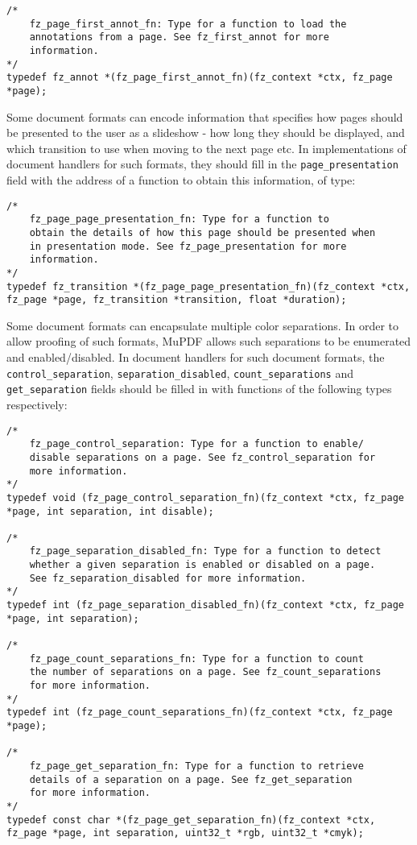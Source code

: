 \documentclass[oneside]{book}
\begin{document}
\begin{lstlisting}
/*
	fz_page_first_annot_fn: Type for a function to load the
	annotations from a page. See fz_first_annot for more
	information.
*/
typedef fz_annot *(fz_page_first_annot_fn)(fz_context *ctx, fz_page *page);
\end{lstlisting}

Some document formats can encode information that specifies how pages should be presented to the user as a slideshow - how long they should be displayed, and which transition to use when moving to the next page etc. In implementations of document handlers for such formats, they should fill in the \texttt{page\_presentation} field with the address of a function to obtain this information, of type:

\begin{lstlisting}
/*
	fz_page_page_presentation_fn: Type for a function to
	obtain the details of how this page should be presented when
	in presentation mode. See fz_page_presentation for more
	information.
*/
typedef fz_transition *(fz_page_page_presentation_fn)(fz_context *ctx, fz_page *page, fz_transition *transition, float *duration);
\end{lstlisting}

Some document formats can encapsulate multiple color separations. In order to allow proofing of such formats, MuPDF allows such separations to be enumerated and enabled/disabled. In document handlers for such document formats, the \texttt{control\_separation}, \texttt{separation\_disabled}, \texttt{count\_separations} and \texttt{get\_separation} fields should be filled in with functions of the following types respectively:

\begin{lstlisting}
/*
	fz_page_control_separation: Type for a function to enable/
	disable separations on a page. See fz_control_separation for
	more information.
*/
typedef void (fz_page_control_separation_fn)(fz_context *ctx, fz_page *page, int separation, int disable);

/*
	fz_page_separation_disabled_fn: Type for a function to detect
	whether a given separation is enabled or disabled on a page.
	See fz_separation_disabled for more information.
*/
typedef int (fz_page_separation_disabled_fn)(fz_context *ctx, fz_page *page, int separation);

/*
	fz_page_count_separations_fn: Type for a function to count
	the number of separations on a page. See fz_count_separations
	for more information.
*/
typedef int (fz_page_count_separations_fn)(fz_context *ctx, fz_page *page);

/*
	fz_page_get_separation_fn: Type for a function to retrieve
	details of a separation on a page. See fz_get_separation
	for more information.
*/
typedef const char *(fz_page_get_separation_fn)(fz_context *ctx, fz_page *page, int separation, uint32_t *rgb, uint32_t *cmyk);
\end{lstlisting}
\end{document}
